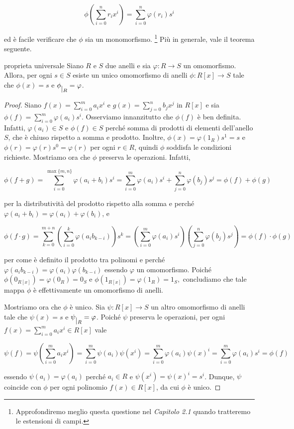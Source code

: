 $$\phi\left( \sum\limits_{i=0}^n r_ix^i \right)=\sum\limits_{i=0}^n \varphi(r_i)s^i$$ 

\noindent ed è facile verificare che $\phi$ sia un monomorfismo.
\footnote{Approfondiremo meglio questa questione nel \emph{Capitolo 2.1} quando tratteremo le estensioni di campi.} 
Più in generale, vale il teorema seguente.

\begin{teo}{proprieta universale}
Siano $R$ e $S$ due anelli e sia $\varphi\colon R\to S$ un omomorfismo. Allora, per ogni $s\in S$ esiste 
un unico omomorfismo di anelli $\phi\colon R[x]\to S$ tale che $\phi(x)=s$ e $\phi \raisebox{-.5em}{$\vert_{R}$}= \varphi$.
\end{teo}
\vspace{-4mm}
\begin{proof}Siano $f(x)=\sum\limits_{i=0}^m a_i x^i$ e $g(x)=\sum\limits_{j=0}^n b_j x^j$ in $R[x]$ 
e sia $\phi(f)=\sum\limits_{i=0}^m \varphi(a_i) s^i$. Osserviamo innanzitutto che $\phi(f)$ è ben definita. 
Infatti, $\varphi(a_i)\in S$ e $\phi(f)\in S$ perché somma di prodotti di elementi dell'anello $S$, 
che è chiuso rispetto a somma e prodotto. Inoltre, $\phi(x)=\varphi(1_R)s^1=s$ e $\phi(r)=\varphi(r)s^0=\varphi(r)$ 
per ogni $r\in R$, quindi $\phi$ soddisfa le condizioni richieste. Mostriamo ora che $\phi$ preserva le operazioni. Infatti, 

\[ \phi(f+g)=\sum\limits_{i=0}^{\max\{m,n\}}\varphi(a_i+b_i)s^i=\sum\limits_{i=0}^{m}\varphi(a_i)s^i+\sum\limits_{j=0}^{n}\varphi(b_j)s^j=\phi(f)+\phi(g) \] 

\noindent per la distributività del prodotto rispetto alla somma e perché $\varphi(a_i+b_i)=\varphi(a_i)+\varphi(b_i)$, e 

\[ \phi(f\cdot g)=\sum\limits_{k=0}^{m+n}\left(\sum\limits_{i=0}^{k}\varphi(a_ib_{k-i})\right)
s^k=\left(\sum\limits_{i=0}^{m}\varphi(a_i)s^i\right)\left(\sum\limits_{j=0}^{n}\varphi(b_j)s^j\right)=\phi(f)\cdot \phi(g) \] 

\noindent per come è definito il prodotto tra polinomi e perché $\varphi(a_ib_{k-i})=\varphi(a_i)\varphi(b_{k-i})$ essendo $\varphi$ 
un omomorfismo. Poiché $\phi(0_{R[x]})=\varphi(0_R)=0_S$ e $\phi(1_{R[x]})=\varphi(1_R)=1_S,$ 
concludiamo che tale mappa $\phi$ è effettivamente un omomorfismo di anelli.

\vspace{2mm}

\noindent Mostriamo ora che $\phi$ è unico. Sia $\psi\colon R[x]\to S$ un altro omomorfismo di anelli 
tale che $\psi(x)=s$ e $\psi \raisebox{-.5em}{$\vert_{R}$}= \varphi$. 
Poiché $\psi$ preserva le operazioni, per ogni $f(x)=\sum\limits_{i=0}^m a_i x^i\in R[x]$ vale 

\[ \psi(f) = \psi\left( \sum\limits_{i=0}^m a_i x^i \right) = 
\sum\limits_{i=0}^m \psi(a_i) \psi(x^i)=\sum\limits_{i=0}^m \varphi(a_i) \psi(x)^i=\sum\limits_{i=0}^m \varphi(a_i) s^i=\phi(f) \] 

\noindent essendo $\psi(a_i)=\varphi(a_i)$ perché $a_i\in R$ e $\psi(x^i)=\psi(x)^i=s^i$. 
Dunque, $\psi$ coincide con $\phi$ per ogni polinomio $f(x)\in R[x]$, da cui $\phi$ è unico.
\end{proof}

